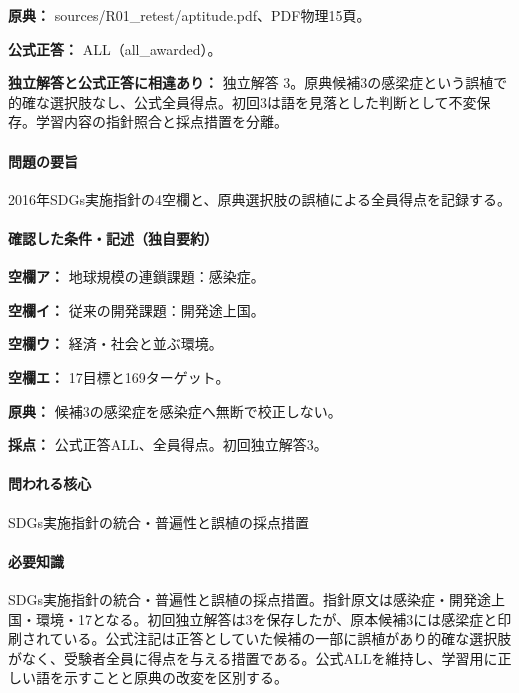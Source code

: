 \noindent\textbf{原典：} sources/R01\_retest/aptitude.pdf、PDF物理15頁。

\textbf{公式正答：} ALL（all\_awarded）。

\par\textbf{独立解答と公式正答に相違あり：} 独立解答 3。原典候補3の感梁症という誤植で的確な選択肢なし、公式全員得点。初回3は語を見落とした判断として不変保存。学習内容の指針照合と採点措置を分離。

\paragraph{問題の要旨} 2016年SDGs実施指針の4空欄と、原典選択肢の誤植による全員得点を記録する。

\paragraph{確認した条件・記述（独自要約）}\mbox{}\par

\noindent\textbf{空欄ア：} 地球規模の連鎖課題：感染症。\par

\noindent\textbf{空欄イ：} 従来の開発課題：開発途上国。\par

\noindent\textbf{空欄ウ：} 経済・社会と並ぶ環境。\par

\noindent\textbf{空欄エ：} 17目標と169ターゲット。\par

\noindent\textbf{原典：} 候補3の感梁症を感染症へ無断で校正しない。\par

\noindent\textbf{採点：} 公式正答ALL、全員得点。初回独立解答3。\par

\paragraph{問われる核心} SDGs実施指針の統合・普遍性と誤植の採点措置

\paragraph{必要知識} SDGs実施指針の統合・普遍性と誤植の採点措置。指針原文は感染症・開発途上国・環境・17となる。初回独立解答は3を保存したが、原本候補3には感梁症と印刷されている。公式注記は正答としていた候補の一部に誤植があり的確な選択肢がなく、受験者全員に得点を与える措置である。公式ALLを維持し、学習用に正しい語を示すことと原典の改変を区別する。

